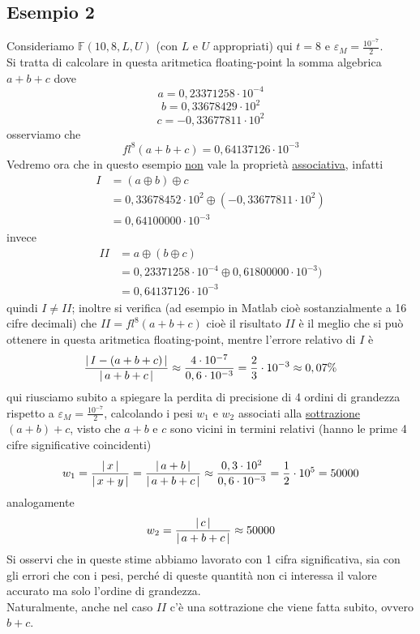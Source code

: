 \documentclass[12pt]{article}
\DeclarePairedDelimiter{\abs}{\lvert}{\rvert}
\begin{document}
\subsection{Esempio 2}
Consideriamo $\mathbb{F}(10,8,L,U)$ (con $L$ e $U$ appropriati) qui $t=8$ e $\varepsilon_M = \frac{10^{-7}}{2}$. \\
Si tratta di calcolare in questa aritmetica floating-point la somma algebrica $a+b+c$ dove \[a=0,23371258 \cdot 10^{-4}\] \[b=0,33678429 \cdot 10^2\] \[c=-0,33677811 \cdot 10^2\] osserviamo che 
\[fl^8(a+b+c)=0,64137126 \cdot 10^{-3}\]
Vedremo ora che in questo esempio \uline{non} vale la proprietà \uline{associativa}, infatti
\[\begin{split}
    I & = (a \oplus b) \oplus c \\
    & = 0,33678452 \cdot 10^2 \oplus (-0,33677811 \cdot 10^2)\\
    & = 0,64100000 \cdot 10^{-3}
\end{split}\]
invece
\[\begin{split}
    II & = a \oplus (b \oplus c) \\
    & = 0,23371258 \cdot 10^{-4} \oplus 0,61800000 \cdot 10^{-3})\\
    & = 0,64137126 \cdot 10^{-3}
\end{split}\]
quindi $I \ne II$; inoltre si verifica (ad esempio in Matlab cioè sostanzialmente a 16 cifre decimali) che $II = fl^8(a+b+c)$ cioè il risultato $II$ è il meglio che si può ottenere in questa aritmetica floating-point, mentre l’errore relativo di $I$ è 
\[\frac{\abs{\,I-(a+b+c)\,}}{\abs{\,a+b+c\,}} \approx \frac{4 \cdot 10^{-7}}{0,6 \cdot 10^{-3}} = \frac{2}{3} \cdot 10^{-3} \approx 0,07\%\] 
qui riusciamo subito a spiegare la perdita di precisione di 4 ordini di grandezza rispetto a $\varepsilon_M = \frac{10^{-7}}{2}$, calcolando i pesi $w_1$ e $w_2$ associati alla \uline{sottrazione} $(a+b)+c$, visto che $a+b$ e $c$ sono vicini in termini relativi (hanno le prime 4 cifre significative coincidenti)
\[w_1 = \frac{\abs{\,x\,}}{\abs{\,x+y\,}} = \frac{\abs{\,a+b\,}}{\abs{\,a+b+c\,}} \approx\frac{0,3 \cdot 10^2}{0,6 \cdot10^{-3}} = \frac{1}{2} \cdot 10^5 = 50000\]
analogamente
\[w_2 = \frac{\abs{\,c\,}}{\abs{\,a+b+c\,}}\approx 50000\]
Si osservi che in queste stime abbiamo lavorato con 1 cifra significativa, sia con gli errori che con i pesi, perché di queste quantità non ci interessa il valore accurato ma solo l’ordine di grandezza.\\
Naturalmente, anche nel caso $II$ c’è una sottrazione che viene fatta subito, ovvero $b+c$.\\
\end{document}
